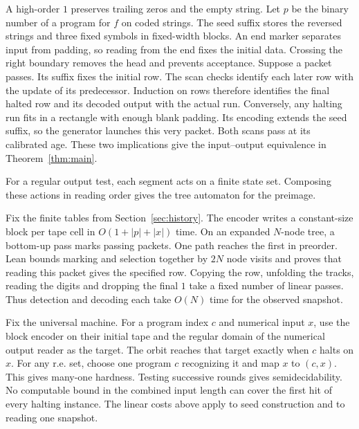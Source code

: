 A high-order $1$ preserves trailing zeros and the empty string. Let $p$ be the binary number of a program for $f$ on coded strings. The seed suffix stores the reversed strings and three fixed symbols in fixed-width blocks. An end marker separates input from padding, so reading from the end fixes the initial data. Crossing the right boundary removes the head and prevents acceptance. Suppose a packet passes. Its suffix fixes the initial row. The scan checks identify each later row with the update of its predecessor. Induction on rows therefore identifies the final halted row and its decoded output with the actual run. Conversely, any halting run fits in a rectangle with enough blank padding. Its encoding extends the seed suffix, so the generator launches this very packet. Both scans pass at its calibrated age. These two implications give the input--output equivalence in Theorem~\ref{thm:main}.

For a regular output test, each segment acts on a finite state set. Composing these actions in reading order gives the tree automaton for the preimage.

Fix the finite tables from Section~\ref{sec:history}. The encoder writes a constant-size block per tape cell in $O(1+|p|+|x|)$ time. On an expanded $N$-node tree, a bottom-up pass marks passing packets. One path reaches the first in preorder. Lean bounds marking and selection together by $2N$ node visits and proves that reading this packet gives the specified row. Copying the row, unfolding the tracks, reading the digits and dropping the final $1$ take a fixed number of linear passes. Thus detection and decoding each take $O(N)$ time for the observed snapshot.

Fix the universal machine. For a program index $c$ and numerical input $x$, use the block encoder on their initial tape and the regular domain of the numerical output reader as the target. The orbit reaches that target exactly when $c$ halts on $x$. For any r.e. set, choose one program $c$ recognizing it and map $x$ to $(c,x)$. This gives many-one hardness. Testing successive rounds gives semidecidability. No computable bound in the combined input length can cover the first hit of every halting instance. The linear costs above apply to seed construction and to reading one snapshot.
